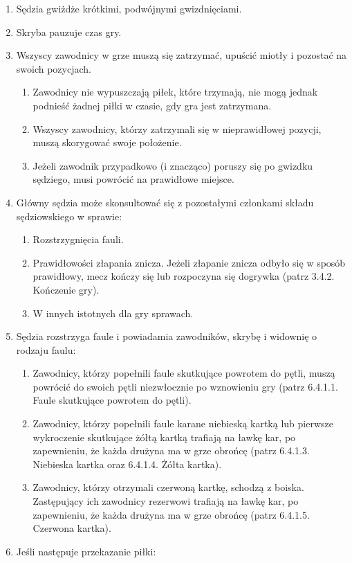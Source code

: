 \documentclass[12pt]{article}
\begin{document}
\begin{enumerate}
	\item
	      Sędzia gwiżdże krótkimi, podwójnymi gwizdnięciami.
	\item
	      Skryba pauzuje czas gry.
	\item
	      Wszyscy zawodnicy w grze muszą się zatrzymać, upuścić miotły i
	      pozostać na swoich pozycjach.

	      \begin{enumerate}
		      \item
		            Zawodnicy nie wypuszczają piłek, które trzymają, nie mogą jednak
		            podnieść żadnej piłki w czasie, gdy gra jest zatrzymana.
		      \item
		            Wszyscy zawodnicy, którzy zatrzymali się w nieprawidłowej pozycji,
		            muszą skorygować swoje położenie.
		      \item
		            Jeżeli zawodnik przypadkowo (i znacząco) poruszy się po gwizdku
		            sędziego, musi powrócić na prawidłowe miejsce.
	      \end{enumerate}
	\item
	      Główny sędzia może skonsultować się z pozostałymi członkami składu
	      sędziowskiego w sprawie:

	      \begin{enumerate}
		      \item
		            Rozstrzygnięcia fauli.
		      \item
		            Prawidłowości złapania znicza. Jeżeli złapanie znicza odbyło się w
		            sposób prawidłowy, mecz kończy się lub rozpoczyna się dogrywka
		            (patrz 3.4.2. Kończenie gry).
		      \item
		            W innych istotnych dla gry sprawach.
	      \end{enumerate}
	\item
	      Sędzia rozstrzyga faule i powiadamia zawodników, skrybę i widownię o
	      rodzaju faulu:

	      \begin{enumerate}
		      \item
		            Zawodnicy, którzy popełnili faule skutkujące powrotem do pętli,
		            muszą powrócić do swoich pętli niezwłocznie po wznowieniu gry (patrz
		            6.4.1.1. Faule skutkujące powrotem do pętli).
		      \item
		            Zawodnicy, którzy popełnili faule karane niebieską kartką lub
		            pierwsze wykroczenie skutkujące żółtą kartką trafiają na ławkę kar,
		            po zapewnieniu, że każda drużyna ma w grze obrońcę (patrz 6.4.1.3.
		            Niebieska kartka oraz 6.4.1.4. Żółta kartka).
		      \item
		            Zawodnicy, którzy otrzymali czerwoną kartkę, schodzą z boiska.
		            Zastępujący ich zawodnicy rezerwowi trafiają na ławkę kar, po
		            zapewnieniu, że każda drużyna ma w grze obrońcę (patrz 6.4.1.5.
		            Czerwona kartka).
	      \end{enumerate}
	\item
	      Jeśli następuje przekazanie piłki:


\end{enumerate}
\end{document}
